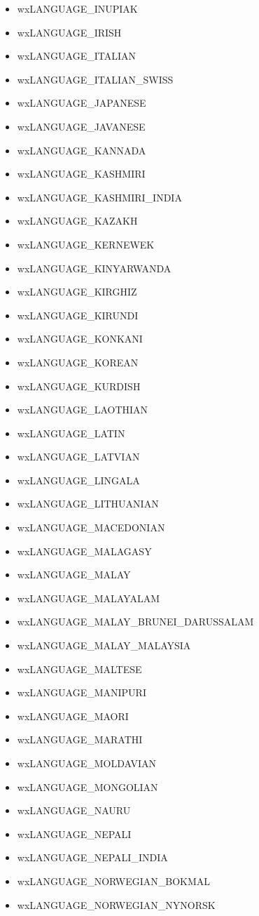 \begin{itemize}
\item wxLANGUAGE\_INUPIAK
\item wxLANGUAGE\_IRISH
\item wxLANGUAGE\_ITALIAN
\item wxLANGUAGE\_ITALIAN\_SWISS
\item wxLANGUAGE\_JAPANESE
\item wxLANGUAGE\_JAVANESE
\item wxLANGUAGE\_KANNADA
\item wxLANGUAGE\_KASHMIRI
\item wxLANGUAGE\_KASHMIRI\_INDIA
\item wxLANGUAGE\_KAZAKH
\item wxLANGUAGE\_KERNEWEK
\item wxLANGUAGE\_KINYARWANDA
\item wxLANGUAGE\_KIRGHIZ
\item wxLANGUAGE\_KIRUNDI
\item wxLANGUAGE\_KONKANI
\item wxLANGUAGE\_KOREAN
\item wxLANGUAGE\_KURDISH
\item wxLANGUAGE\_LAOTHIAN
\item wxLANGUAGE\_LATIN
\item wxLANGUAGE\_LATVIAN
\item wxLANGUAGE\_LINGALA
\item wxLANGUAGE\_LITHUANIAN
\item wxLANGUAGE\_MACEDONIAN
\item wxLANGUAGE\_MALAGASY
\item wxLANGUAGE\_MALAY
\item wxLANGUAGE\_MALAYALAM
\item wxLANGUAGE\_MALAY\_BRUNEI\_DARUSSALAM
\item wxLANGUAGE\_MALAY\_MALAYSIA
\item wxLANGUAGE\_MALTESE
\item wxLANGUAGE\_MANIPURI
\item wxLANGUAGE\_MAORI
\item wxLANGUAGE\_MARATHI
\item wxLANGUAGE\_MOLDAVIAN
\item wxLANGUAGE\_MONGOLIAN
\item wxLANGUAGE\_NAURU
\item wxLANGUAGE\_NEPALI
\item wxLANGUAGE\_NEPALI\_INDIA
\item wxLANGUAGE\_NORWEGIAN\_BOKMAL
\item wxLANGUAGE\_NORWEGIAN\_NYNORSK

\end{itemize}
